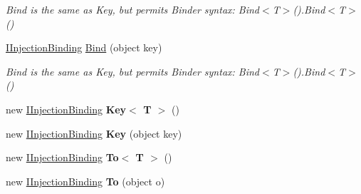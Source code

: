 \begin{DoxyCompactItemize}
\begin{DoxyCompactList}\small\item\em Bind is the same as Key, but permits Binder syntax\-: {\ttfamily Bind$<$T$>$().Bind$<$T$>$()} \end{DoxyCompactList}\item 
\hypertarget{classstrange_1_1extensions_1_1injector_1_1impl_1_1_injection_binding_af14ba168b6cc7a2624fe035a933b7c33}{\hyperlink{interfacestrange_1_1extensions_1_1injector_1_1api_1_1_i_injection_binding}{I\-Injection\-Binding} \hyperlink{classstrange_1_1extensions_1_1injector_1_1impl_1_1_injection_binding_af14ba168b6cc7a2624fe035a933b7c33}{Bind} (object key)}\label{classstrange_1_1extensions_1_1injector_1_1impl_1_1_injection_binding_af14ba168b6cc7a2624fe035a933b7c33}

\begin{DoxyCompactList}\small\item\em Bind is the same as Key, but permits Binder syntax\-: {\ttfamily Bind$<$T$>$().Bind$<$T$>$()} \end{DoxyCompactList}\item 
\hypertarget{classstrange_1_1extensions_1_1injector_1_1impl_1_1_injection_binding_aef52ed6a0ff8e7fffacce72b3d1b4c19}{new \hyperlink{interfacestrange_1_1extensions_1_1injector_1_1api_1_1_i_injection_binding}{I\-Injection\-Binding} {\bfseries Key$<$ T $>$} ()}\label{classstrange_1_1extensions_1_1injector_1_1impl_1_1_injection_binding_aef52ed6a0ff8e7fffacce72b3d1b4c19}

\item 
\hypertarget{classstrange_1_1extensions_1_1injector_1_1impl_1_1_injection_binding_ae7141199262e6a7c63c2b0f6489933a9}{new \hyperlink{interfacestrange_1_1extensions_1_1injector_1_1api_1_1_i_injection_binding}{I\-Injection\-Binding} {\bfseries Key} (object key)}\label{classstrange_1_1extensions_1_1injector_1_1impl_1_1_injection_binding_ae7141199262e6a7c63c2b0f6489933a9}

\item 
\hypertarget{classstrange_1_1extensions_1_1injector_1_1impl_1_1_injection_binding_a5c1d315334796d4ec9991504634e6598}{new \hyperlink{interfacestrange_1_1extensions_1_1injector_1_1api_1_1_i_injection_binding}{I\-Injection\-Binding} {\bfseries To$<$ T $>$} ()}\label{classstrange_1_1extensions_1_1injector_1_1impl_1_1_injection_binding_a5c1d315334796d4ec9991504634e6598}

\item 
\hypertarget{classstrange_1_1extensions_1_1injector_1_1impl_1_1_injection_binding_a010293da2e6b1fda3ad01f384a8c006f}{new \hyperlink{interfacestrange_1_1extensions_1_1injector_1_1api_1_1_i_injection_binding}{I\-Injection\-Binding} {\bfseries To} (object o)}\label{classstrange_1_1extensions_1_1injector_1_1impl_1_1_injection_binding_a010293da2e6b1fda3ad01f384a8c006f}


\end{DoxyCompactItemize}
